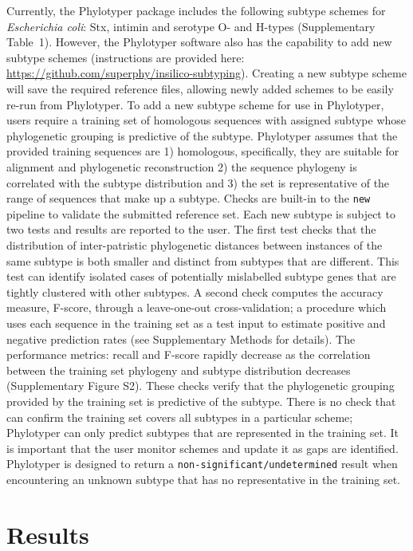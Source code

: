 \documentclass{bioinfo}
\begin{document}
Currently, the Phylotyper package includes the following subtype schemes for \emph{Escherichia coli}: Stx, intimin and serotype O- and H-types  (Supplementary Table~1).
However, the Phylotyper software also has the capability to add new subtype schemes (instructions are provided here: \url{https://github.com/superphy/insilico-subtyping}). 
Creating a new subtype scheme will save the required reference files, allowing newly added schemes to be easily re-run from Phylotyper.
To add a new subtype scheme for use in Phylotyper, users require a training set of homologous sequences with assigned subtype whose phylogenetic grouping is predictive of the subtype.
Phylotyper assumes that the provided training sequences are 1) homologous, specifically, they are suitable for alignment and phylogenetic reconstruction 2) the sequence phylogeny is correlated with the subtype distribution and 3) the set is representative of the range of sequences that make up a subtype.
Checks are built-in to the \texttt{new} pipeline to validate the submitted reference set.
Each new subtype is subject to two tests and results are reported to the user.
The first test checks that the distribution of inter-patristic phylogenetic distances between instances of the same subtype is both smaller and distinct from subtypes that are different.
This test can identify isolated cases of potentially mislabelled subtype genes that are tightly clustered with other subtypes.
A second check computes the accuracy measure, F-score, through a leave-one-out cross-validation; a procedure which uses each sequence in the training set as a test input to estimate positive and negative prediction rates (see Supplementary Methods for details).
The performance metrics: recall and F-score rapidly decrease as the correlation between the training set phylogeny and subtype distribution decreases (Supplementary Figure S2).
These checks verify that the phylogenetic grouping provided by the training set is predictive of the subtype.
There is no check that can confirm the training set covers all subtypes in a particular scheme; Phylotyper can only predict subtypes that are represented in the training set.
It is important that the user monitor schemes and update it as gaps are identified.
Phylotyper is designed to return a \texttt{non-significant/undetermined} result when encountering an unknown subtype that has no representative in the training set.

\section{Results}
\end{document}
